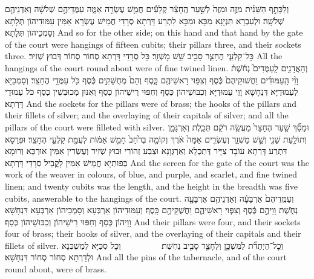 {%
{וְלַכָּתֵ֣ף הַשֵּׁנִ֗ית מִזֶּ֤ה וּמִזֶּה֙ לְשַׁ֣עַר הֶֽחָצֵ֔ר קְלָעִ֕ים חֲמֵ֥שׁ עֶשְׂרֵ֖ה אַמָּ֑ה עַמֻּדֵיהֶ֣ם שְׁלֹשָׁ֔ה וְאַדְנֵיהֶ֖ם שְׁלֹשָֽׁה׃}
{וּלְעִבְרָא תִּנְיָנָא מִכָּא וּמִכָּא לִתְרַע דָּרְתָא סְרָדֵי חֲמֵישׁ עֶשְׂרָא אַמִּין עַמּוּדֵיהוֹן תְּלָתָא וְסָמְכֵיהוֹן תְּלָתָא׃}
{And so for the other side; on this hand and that hand by the gate of the court were hangings of fifteen cubits; their pillars three, and their sockets three.}{}
{כׇּל־קַלְעֵ֧י הֶחָצֵ֛ר סָבִ֖יב שֵׁ֥שׁ מׇשְׁזָֽר׃}
{כָּל סְרָדֵי דָּרְתָא סְחוֹר סְחוֹר דְּבוּץ שְׁזִיר׃}
{All the hangings of the court round about were of fine twined linen.}{}
{וְהָאֲדָנִ֣ים לָֽעַמֻּדִים֮ נְחֹ֒שֶׁת֒ וָוֵ֨י הָֽעַמּוּדִ֜ים וַחֲשׁוּקֵיהֶם֙ כֶּ֔סֶף וְצִפּ֥וּי רָאשֵׁיהֶ֖ם כָּ֑סֶף וְהֵם֙ מְחֻשָּׁקִ֣ים כֶּ֔סֶף כֹּ֖ל עַמֻּדֵ֥י הֶחָצֵֽר׃}
{וְסָמְכַיָּא לְעַמּוּדַיָּא דִּנְחָשָׁא וָוֵי עַמּוּדַיָּא וְכִבּוּשֵׁיהוֹן כְּסַף וְחִפּוּי רֵישֵׁיהוֹן כְּסַף וְאִנּוּן מְכוּבְּשִׁין כְּסַף כֹּל עַמּוּדֵי דָּרְתָא׃}
{And the sockets for the pillars were of brass; the hooks of the pillars and their fillets of silver; and the overlaying of their capitals of silver; and all the pillars of the court were filleted with silver.}{}
{וּמָסַ֞ךְ שַׁ֤עַר הֶחָצֵר֙ מַעֲשֵׂ֣ה רֹקֵ֔ם תְּכֵ֧לֶת וְאַרְגָּמָ֛ן וְתוֹלַ֥עַת שָׁנִ֖י וְשֵׁ֣שׁ מָשְׁזָ֑ר וְעֶשְׂרִ֤ים אַמָּה֙ אֹ֔רֶךְ וְקוֹמָ֤ה בְרֹ֙חַב֙ חָמֵ֣שׁ אַמּ֔וֹת לְעֻמַּ֖ת קַלְעֵ֥י הֶחָצֵֽר׃
}
{וּפְרָסָא דִּתְרַע דָּרְתָא עוֹבָד צַיָּיר דְּתַכְלָא וְאַרְגְּוָנָא וּצְבַע זְהוֹרִי וּבוּץ שְׁזִיר וְעֶשְׂרִין אַמִּין אוּרְכָּא וְרוּמָא בְּפוּתְיָא חֲמֵישׁ אַמִּין לָקֳבֵיל סְרָדֵי דָּרְתָא׃}
{And the screen for the gate of the court was the work of the weaver in colours, of blue, and purple, and scarlet, and fine twined linen; and twenty cubits was the length, and the height in the breadth was five cubits, answerable to the hangings of the court.}{}
{וְעַמֻּֽדֵיהֶם֙ אַרְבָּעָ֔ה וְאַדְנֵיהֶ֥ם אַרְבָּעָ֖ה נְחֹ֑שֶׁת וָוֵיהֶ֣ם כֶּ֔סֶף וְצִפּ֧וּי רָאשֵׁיהֶ֛ם וַחֲשֻׁקֵיהֶ֖ם כָּֽסֶף׃}
{וְעַמּוּדֵיהוֹן אַרְבְּעָא וְסָמְכֵיהוֹן אַרְבְּעָא דִּנְחָשָׁא וָוֵיהוֹן כְּסַף וְחִפּוּי רֵישֵׁיהוֹן וְכִבּוּשֵׁיהוֹן כְּסַף׃}
{And their pillars were four, and their sockets four of brass; their hooks of silver, and the overlaying of their capitals and their fillets of silver.}{}
{וְֽכׇל־הַיְתֵדֹ֞ת לַמִּשְׁכָּ֧ן וְלֶחָצֵ֛ר סָבִ֖יב נְחֹֽשֶׁת׃ \setuma         }
{וְכָל סִכַּיָּא לְמַשְׁכְּנָא וּלְדָרְתָא סְחוֹר סְחוֹר דִּנְחָשָׁא׃}
{And all the pins of the tabernacle, and of the court round about, were of brass.}{}
}
